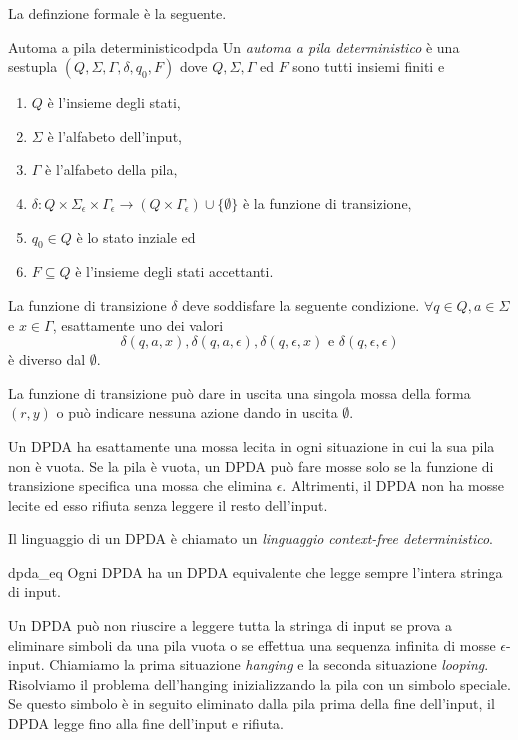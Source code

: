 \documentclass[12pt]{report}
\newcounter{lemma}
\newcounter{definition}
\newcommand{\nmu}{}
\begin{document}
La definzione formale è la seguente.
\begin{definition}{\nmu Automa a pila deterministico}{dpda}
	Un \textit{automa a pila deterministico} è una sestupla $(Q, \Sigma, \Gamma, \delta, q_0, F)$ dove $Q, \Sigma, \Gamma$ ed $F$ sono tutti insiemi finiti e
	\begin{enumerate}
		\item $Q$ è l'insieme degli stati,
		\item $\Sigma$ è l'alfabeto dell'input,
		\item $\Gamma$ è l'alfabeto della pila,
		\item $\delta: Q \times \Sigma_\epsilon \times \Gamma_\epsilon \to (Q \times \Gamma_\epsilon) \cup \{\emptyset\}$ è la funzione di transizione,
		\item $q_0 \in Q$ è lo stato inziale ed
		\item $F \subseteq Q$ è l'insieme degli stati accettanti.
	\end{enumerate}
	La funzione di transizione $\delta$ deve soddisfare la seguente condizione. $\forall q \in Q, a \in \Sigma$ e $x \in \Gamma$, esattamente uno dei valori
	\[
	\delta(q, a, x), \delta(q, a, \epsilon), \delta(q, \epsilon, x) \text{ e } \delta(q, \epsilon, \epsilon)
	\]
	è diverso dal $\emptyset$.
\end{definition}
La funzione di transizione può dare in uscita una singola mossa della forma $(r, y)$ o può indicare nessuna azione dando in uscita $\emptyset$.

Un DPDA ha esattamente una mossa lecita in ogni situazione in cui la sua pila non è vuota. Se la pila è vuota, un DPDA può fare mosse solo se la funzione di transizione specifica una mossa che elimina $\epsilon$. Altrimenti, il DPDA non ha mosse lecite ed esso rifiuta senza leggere il resto dell'input.

Il linguaggio di un DPDA è chiamato un \textit{linguaggio context-free deterministico}.
\begin{lemma}{}{dpda_eq}
Ogni DPDA ha un DPDA equivalente che legge sempre l'intera stringa di input.
\end{lemma}
Un DPDA può non riuscire a leggere tutta la stringa di input se prova a eliminare simboli da una pila vuota o se effettua una sequenza infinita di mosse $\epsilon$-input.  Chiamiamo la prima situazione \textit{hanging} e la seconda situazione \textit{looping}. Risolviamo il problema dell'hanging inizializzando la pila con un simbolo speciale. Se questo simbolo è in seguito eliminato dalla pila prima della fine dell'input, il DPDA legge fino alla fine dell'input e rifiuta.
\end{document}
